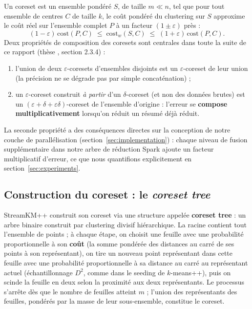 Un coreset est un ensemble pondéré $S$, de taille $m \ll n$, tel que pour tout
ensemble de centres $C$ de taille $k$, le coût pondéré du clustering sur $S$
approxime le coût réel sur l'ensemble complet $P$ à un facteur
$(1\pm\varepsilon)$ près :
\[
(1-\varepsilon)\,\mathrm{cost}(P,C) \;\le\; \mathrm{cost}_w(S,C) \;\le\;
(1+\varepsilon)\,\mathrm{cost}(P,C).
\]
Deux propriétés de composition des coresets sont centrales dans toute la
suite de ce rapport (thèse \cite{bitsakis2018}, section 2.3.4) :
\begin{enumerate}
  \item l'union de deux $\varepsilon$-coresets d'ensembles disjoints est un
        $\varepsilon$-coreset de leur union (la précision ne se dégrade pas
        par simple concaténation) ;
  \item un $\varepsilon$-coreset construit \emph{à partir} d'un
        $\delta$-coreset (et non des données brutes) est un
        $(\varepsilon+\delta+\varepsilon\delta)$-coreset de l'ensemble
        d'origine : l'erreur se \textbf{compose multiplicativement}
        lorsqu'on réduit un résumé déjà réduit.
\end{enumerate}
La seconde propriété a des conséquences directes sur la conception de notre
couche de parallélisation (section~\ref{sec:implementation}) : chaque niveau
de fusion supplémentaire dans notre arbre de réduction Spark ajoute un
facteur multiplicatif d'erreur, ce que nous quantifions explicitement en
section~\ref{sec:experiments}.

\subsection{Construction du coreset : le \emph{coreset tree}}

StreamKM++ construit son coreset via une structure appelée
\textbf{coreset tree} : un arbre binaire construit par clustering divisif
hiérarchique. La racine contient tout l'ensemble de points ; à chaque étape,
on choisit une feuille avec une probabilité proportionnelle à son
\textbf{coût} (la somme pondérée des distances au carré de ses points à son
représentant), on tire un nouveau point représentant dans cette feuille avec
une probabilité proportionnelle à sa distance au carré au représentant actuel
(échantillonnage $D^2$, comme dans le seeding de $k$-means++), puis on scinde
la feuille en deux selon la proximité aux deux représentants. Le processus
s'arrête dès que le nombre de feuilles atteint $m$ ; l'union des
représentants des feuilles, pondérés par la masse de leur sous-ensemble,
constitue le coreset.

